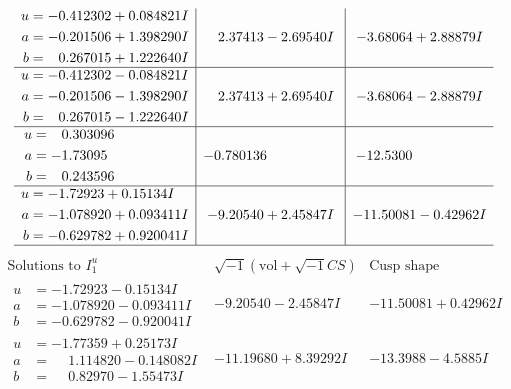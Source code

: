\documentclass[1p]{elsarticle_modified}
\theoremstyle{definition}
\newcommand{\I}{\sqrt{-1}}
\begin{document}
$$\begin{array}{c|c|c}
\begin{aligned}
u &= -0.412302 + 0.084821 I \\
a &= -0.201506 + 1.398290 I \\
b &= \phantom{-}0.267015 + 1.222640 I\end{aligned}
 & \phantom{-}2.37413 - 2.69540 I & -3.68064 + 2.88879 I \\ \hline\begin{aligned}
u &= -0.412302 - 0.084821 I \\
a &= -0.201506 - 1.398290 I \\
b &= \phantom{-}0.267015 - 1.222640 I\end{aligned}
 & \phantom{-}2.37413 + 2.69540 I & -3.68064 - 2.88879 I \\ \hline\begin{aligned}
u &= \phantom{-}0.303096\phantom{ +0.000000I} \\
a &= -1.73095\phantom{ +0.000000I} \\
b &= \phantom{-}0.243596\phantom{ +0.000000I}\end{aligned}
 & -0.780136\phantom{ +0.000000I} & -12.5300\phantom{ +0.000000I} \\ \hline\begin{aligned}
u &= -1.72923 + 0.15134 I \\
a &= -1.078920 + 0.093411 I \\
b &= -0.629782 + 0.920041 I\end{aligned}
 & -9.20540 + 2.45847 I & -11.50081 - 0.42962 I\\
 \hline 
 \end{array}$$\newpage$$\begin{array}{c|c|c}  
\text{Solutions to }I^u_{1}& \I (\text{vol} + \sqrt{-1}CS) & \text{Cusp shape}\\
 \hline 
\begin{aligned}
u &= -1.72923 - 0.15134 I \\
a &= -1.078920 - 0.093411 I \\
b &= -0.629782 - 0.920041 I\end{aligned}
 & -9.20540 - 2.45847 I & -11.50081 + 0.42962 I \\ \hline\begin{aligned}
u &= -1.77359 + 0.25173 I \\
a &= \phantom{-}1.114820 - 0.148082 I \\
b &= \phantom{-}0.82970 - 1.55473 I\end{aligned}
 & -11.19680 + 8.39292 I & -13.3988 - 4.5885 I \\ \hline\begin{aligned}

\end{aligned}
\end{array}$$
\end{document}
